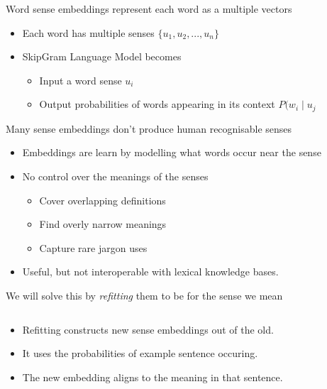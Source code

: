 \documentclass[dvipsnames]{beamer}
\newcommand{\inputcolumn}[1]{%
	\begin{column}{0.5\textwidth}
		\begin{adjustbox}{max width=\columnwidth}
			
		\end{adjustbox}
	\end{column}%
}
\begin{document}
\begin{frame}{Word sense embeddings represent each word as a multiple vectors}
	\begin{itemize}
		\item Each word has multiple senses $\{u_1, u_2, ..., u_n\}$
		\item SkipGram Language Model becomes \begin{itemize}
			\item \alert{Input} a word sense $u_i$
			\item \alert{Output} probabilities of words appearing in its context \alert{$P(w_i \mid u_j$}
		\end{itemize}
	\end{itemize}
	\sentexample
\end{frame}

\begin{frame}{Many sense embeddings don't produce human recognisable senses}
	 \begin{itemize}
	 	\item<1-> Embeddings are learn by modelling what words occur near the sense
	 	\item<2-> No control over the meanings of the senses \begin{itemize}
	 		\item Cover overlapping definitions
	 		\item Find overly narrow meanings
	 		\item Capture rare jargon uses
	 	\end{itemize}
		\item<3-> Useful, but not interoperable with lexical knowledge bases.	
	 \end{itemize}
\end{frame}



\begin{frame}{We will solve this by \emph{refitting} them to be for the sense we mean}
	\begin{columns}[T]
		\begin{column}{0.5\textwidth}
			\begin{itemize}
				\item \alert{Refitting} constructs new sense embeddings out of the old.
				
				\item It uses the \alert{probabilities} of example sentence occuring.
				
				\item The new embedding aligns to the meaning in that sentence.
			\end{itemize}			
		\end{column}
		
		\inputcolumn{../figs/refitting.tex}
		
	\end{columns}
\end{frame}
\end{document}
